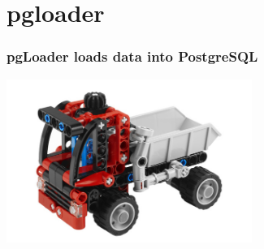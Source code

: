 \documentclass{beamer}
\begin{document}
\section{pgloader}

{
  \begin{frame}[plain]
  \end{frame}
}

\begin{frame}[fragile]
  \frametitle{pgLoader loads data into PostgreSQL}


  \begin{center}
    \includegraphics[height=2.1in]{pgloader.jpg}
  \end{center}
\end{frame}
\end{document}

